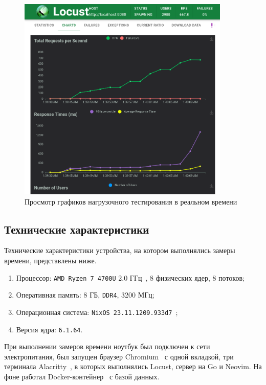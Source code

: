 \begin{figure}[H]
	\centering
	\includegraphics[width=0.9\textwidth]{img/locust-scr-3.png}
	\caption{Просмотр графиков нагрузочного тестирования в реальном времени}
	\label{locust:3}
\end{figure}

\newpage

\subsection{Технические характеристики}

Технические характеристики устройства, на котором выполнялись замеры времени, представлены ниже.
\begin{enumerate}
    \item Процессор: \texttt{AMD Ryzen 7 4700U} 2.0 ГГц~\cite{amd}, 8 физических ядер, 8 потоков;
    \item Оперативная память: 8 ГБ, \texttt{DDR4}, 3200 МГц;
    \item Операционная система: \texttt{NixOS 23.11.1209.933d7}~\cite{nixos};
    \item Версия ядра: \texttt{6.1.64}.
\end{enumerate}

При выполнении замеров времени ноутбук был подключен к сети электропитания, был запущен браузер Chromium~\cite{chromium} с одной вкладкой, три терминала Alacritty~\cite{alacritty}, в которых выполнялись Locust, сервер на Go и Neovim.
На фоне работал Docker-контейнер~\cite{docker} с базой данных.

